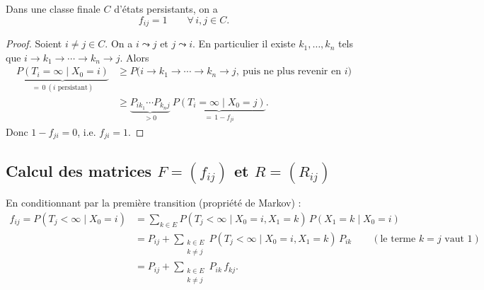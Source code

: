 \begin{proposition}
Dans une classe finale $C$ d'états persistants, on a
\[
f_{ij} = 1 \qquad \forall\, i, j \in C .
\]
\end{proposition}

\begin{proof}
Soient $i \neq j \in C$. On a $i \leadsto j$ et $j \leadsto i$. En particulier il existe $k_1, \dots, k_n$ tels que
$i \to k_1 \to \cdots \to k_n \to j$. Alors
\begin{align*}
\underbrace{P(T_i = \infty \mid X_0 = i)}_{=\,0\ (i \text{ persistant})}
&\geq P\big( i \to k_1 \to \cdots \to k_n \to j,\ \text{puis ne plus revenir en } i \big) \\
&\geq \underbrace{P_{ik_1} \cdots P_{k_n j}}_{>0}\ \underbrace{P(T_i = \infty \mid X_0 = j)}_{=\,1 - f_{ji}} .
\end{align*}
Donc $1 - f_{ji} = 0$, i.e. $f_{ji} = 1$.
\end{proof}

\subsection*{Calcul des matrices $F = (f_{ij})$ et $R = (R_{ij})$}

En conditionnant par la première transition (propriété de Markov) :
\begin{align*}
f_{ij} = P(T_j < \infty \mid X_0 = i)
&= \sum_{k \in E} P(T_j < \infty \mid X_0 = i, X_1 = k)\, P(X_1 = k \mid X_0 = i) \\
&= P_{ij} + \sum_{\substack{k \in E \\ k \neq j}} P(T_j < \infty \mid X_0 = i, X_1 = k)\, P_{ik}
\qquad (\text{le terme } k = j \text{ vaut } 1) \\
&= P_{ij} + \sum_{\substack{k \in E \\ k \neq j}} P_{ik}\, f_{kj} .
\end{align*}

